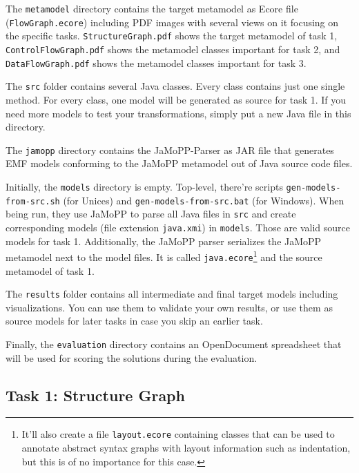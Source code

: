 \documentclass[11pt]{article}
\begin{document}
The \verb|metamodel| directory contains the target metamodel as Ecore file
(\verb|FlowGraph.ecore|) including PDF images with several views on it focusing
on the specific tasks.  \verb|StructureGraph.pdf| shows the target metamodel of
task 1, \verb|ControlFlowGraph.pdf| shows the metamodel classes important for
task 2, and \verb|DataFlowGraph.pdf| shows the metamodel classes important for
task 3.

The \verb|src| folder contains several Java classes.  Every class contains just
one single method.  For every class, one model will be generated as source for
task 1.  If you need more models to test your transformations, simply put a new
Java file in this directory.

The \verb|jamopp| directory contains the JaMoPP-Parser as JAR file that
generates EMF models conforming to the JaMoPP metamodel out of Java source code
files.

Initially, the \verb|models| directory is empty.  Top-level, there're scripts
\verb|gen-models-from-src.sh| (for Unices) and \verb|gen-models-from-src.bat|
(for Windows).  When being run, they use JaMoPP to parse all Java files in
\verb|src| and create corresponding models (file extension \verb|java.xmi|) in
\verb|models|.  Those are valid source models for task 1.  Additionally, the
JaMoPP parser serializes the JaMoPP metamodel next to the model files.  It is
called \verb|java.ecore|\footnote{It'll also create a file
  \texttt{layout.ecore} containing classes that can be used to annotate
  abstract syntax graphs with layout information such as indentation, but this
  is of no importance for this case.} and the source metamodel of task 1.

The \verb|results| folder contains all intermediate and final target models
including visualizations.  You can use them to validate your own results, or
use them as source models for later tasks in case you skip an earlier task.

Finally, the \verb|evaluation| directory contains an OpenDocument spreadsheet
that will be used for scoring the solutions during the evaluation.


\subsection{Task 1: Structure Graph}
\label{sec:task1-structure-graph}
\end{document}
